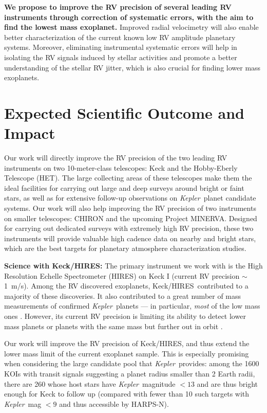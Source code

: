 \documentclass[12pt]{article}
\def\mps{m/s}
\def\kepler{{\it Kepler}}
\def\minerva{MINERVA}
\def\keck{Keck/HIRES}
\begin{document}
\textbf{We propose to improve the RV precision of several leading RV
  instruments through correction of systematic errors, with the aim to
  find the lowest mass exoplanet.} Improved radial velocimetry will
also enable better characterization of the current known low RV
amplitude planetary systems. Moreover, eliminating instrumental
systematic errors will help in isolating the RV signals induced by
stellar activities and promote a better understanding of the stellar
RV jitter, which is also crucial for finding lower mass exoplanets.


\vspace{-3pt}
\section{Expected Scientific Outcome and Impact}

Our work will directly improve the RV precision of the two leading RV
instruments on two 10-meter-class telescopes: Keck and the
Hobby-Eberly Telescope (HET). The large collecting areas of these
telescopes make them the ideal facilities for carrying out large and
deep surveys around bright or faint stars, as well as for extensive
follow-up observations on \kepler\ planet candidate systems. Our work
will also help improving the RV precision of two
instruments on smaller telescopes: CHIRON and the upcoming Project
\minerva. Designed for carrying out dedicated surveys with extremely
high RV precision, these two instruments will provide valuable high
cadence data on nearby and bright stars, which are the best targets
for planetary atmosphere characterization studies.

\textbf{Science with \keck: } The primary instrument we work with is
the High Resolution Echelle Spectrometer (HIRES) on Keck I (current RV
precision $\sim$1~\mps). Among the RV discovered exoplanets,
\keck\ contributed to a majority of these discoveries. It also
contributed to a great number of mass measurements of confirmed
\kepler\ planets --- in particular, \textit{most} of the low mass ones
\citep[e.g.,][]{gautier2012,gilliland2013,howard2013,marcy2014}. However,
its current RV precision is limiting its ability to detect lower mass
planets or planets with the same mass but further out in orbit
\citep[e.g.,][]{marcy2014}.

Our work will improve the RV precision of \keck, and thus extend the
lower mass limit of the current exoplanet sample. This is especially
promising when considering the large candidate pool that
\kepler\ provides: among the 1600 KOIs with transit signals suggesting
a planet radius smaller than 2 Earth radii, there are 260 whose host
stars have \kepler\ magnitude $< 13$ and are thus bright enough for
Keck to follow up (compared with fewer than 10 such targets with
\kepler\ mag $< 9$ and thus accessible by HARPS-N).
\end{document}
